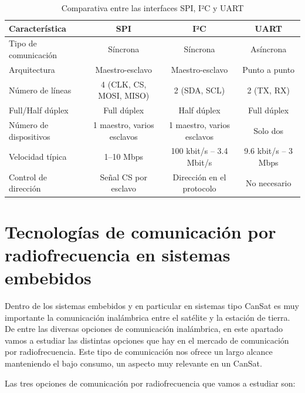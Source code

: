 \begin{table}[h]
    \centering
    \footnotesize
    \renewcommand{\arraystretch}{1.1}
    \begin{tabular}{|l|c|c|c|}
        \hline
        \textbf{Característica} & \textbf{SPI}               & \textbf{I²C}               & \textbf{UART}       \\
        \hline
        Tipo de comunicación    & Síncrona                   & Síncrona                   & Asíncrona           \\
        \hline
        Arquitectura            & Maestro-esclavo            & Maestro-esclavo            & Punto a punto       \\
        \hline
        Número de líneas        & 4 (CLK, CS, MOSI, MISO)    & 2 (SDA, SCL)               & 2 (TX, RX)          \\
        \hline
        Full/Half dúplex        & Full dúplex                & Half dúplex                & Full dúplex         \\
        \hline
        Número de dispositivos  & 1 maestro, varios esclavos & 1 maestro, varios esclavos & Solo dos            \\
        \hline
        Velocidad típica        & 1–10 Mbps                  & 100 kbit/s – 3.4 Mbit/s    & 9.6 kbit/s – 3 Mbps \\
        \hline
        Control de dirección    & Señal CS por esclavo       & Dirección en el protocolo  & No necesario        \\
        \hline
    \end{tabular}
    \caption{Comparativa entre las interfaces SPI, I²C y UART}
    \label{tab:comparativa_interfaces}
\end{table}


\section{Tecnologías de comunicación por radiofrecuencia en sistemas embebidos}
Dentro de los sistemas embebidos y en particular en sistemas tipo CanSat es muy importante la comunicación inalámbrica entre el satélite y la estación de tierra.
De entre las diversas opciones de comunicación inalámbrica, en este apartado vamos a estudiar las distintas opciones que hay en el mercado de comunicación por radiofrecuencia.
Este tipo de comunicación nos ofrece un largo alcance manteniendo el bajo consumo, un aspecto muy relevante en un CanSat.

Las tres opciones de comunicación por radiofrecuencia que vamos a estudiar son:

